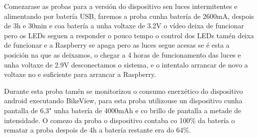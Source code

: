 
Comezarase as probas para a versión do dispositivo sen luces intermitentes e alimentando por batería USB, faremos a proba cunha batería de  2600mA, despois de 3h e 30min e coa batería a unha voltaxe de 3.2V o vídeo deixa de funcionar pero os LEDs seguen a responder o pouco tempo o control dos LEDs tamén deixa de funcionar e a Raspberry se apaga pero as luces segue acesas se é esta a posición na que as deixamos,  o chegar a 4 horas de funcionamento das luces e unha voltaxe de 2.9V desconectamos o sistema, e o intentalo arrancar de novo a voltaxe no e suficiente para arrancar a Raspberry.

Durante esta proba tamén se monitorizou o consumo enerxético do dispositivo android executando BikeView, para esta proba utilizouse un dispositivo cunha pantalla de 6,3" unha batería de 4000mAh e co brillo de pantalla a metade de intensidade. O comezo da proba o dispositivo contaba co 100\(\%\) da batería o rematar a proba despois de 4h a batería restante era do 64\(\%\).

